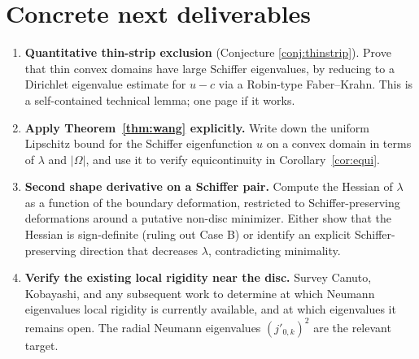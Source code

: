 \documentclass[11pt]{article}
\newcommand{\Om}{\Omega}
\newcommand{\1}{\mathbf 1}
\begin{document}
\section{Concrete next deliverables}

\begin{enumerate}[leftmargin=*]
    \item \textbf{Quantitative thin-strip exclusion} (Conjecture
    \ref{conj:thinstrip}). Prove that thin convex domains have large
    Schiffer eigenvalues, by reducing to a Dirichlet eigenvalue
    estimate for $u-c$ via a Robin-type Faber--Krahn. This is a
    self-contained technical lemma; one page if it works.
    \item \textbf{Apply Theorem~\ref{thm:wang} explicitly.}
    Write down the uniform Lipschitz bound for the Schiffer
    eigenfunction $u$ on a convex domain in terms of
    $\lambda$ and $|\Om|$, and use it to verify equicontinuity in
    Corollary~\ref{cor:equi}.
    \item \textbf{Second shape derivative on a Schiffer pair.}
    Compute the Hessian of $\lambda$ as a function of the boundary
    deformation, restricted to Schiffer-preserving deformations
    around a putative non-disc minimizer. Either show that the
    Hessian is sign-definite (ruling out Case B) or identify an
    explicit Schiffer-preserving direction that decreases $\lambda$,
    contradicting minimality.
    \item \textbf{Verify the existing local rigidity near the disc.}
    Survey Canuto, Kobayashi, and any subsequent work to determine at
    which Neumann eigenvalues local rigidity is currently available,
    and at which eigenvalues it remains open. The radial Neumann
    eigenvalues $(j'_{0,k})^2$ are the relevant target.
\end{enumerate}
\end{document}
